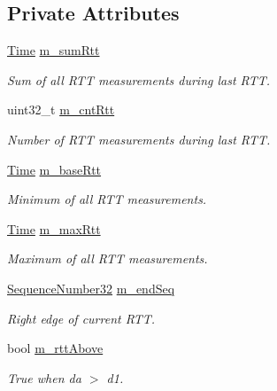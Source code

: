 \subsection*{Private Attributes}
\begin{DoxyCompactItemize}
\item 
\hyperlink{classns3_1_1Time}{Time} \hyperlink{classns3_1_1TcpIllinois_ad55319050ef5775367528ab1e2a1495d}{m\+\_\+sum\+Rtt}
\begin{DoxyCompactList}\small\item\em Sum of all R\+TT measurements during last R\+TT. \end{DoxyCompactList}\item 
uint32\+\_\+t \hyperlink{classns3_1_1TcpIllinois_a60caf4d41dc12eaf51e6fa4d2bc37cf9}{m\+\_\+cnt\+Rtt}
\begin{DoxyCompactList}\small\item\em Number of R\+TT measurements during last R\+TT. \end{DoxyCompactList}\item 
\hyperlink{classns3_1_1Time}{Time} \hyperlink{classns3_1_1TcpIllinois_a50fb2e63ddbc6291c27c6360f871ec9f}{m\+\_\+base\+Rtt}
\begin{DoxyCompactList}\small\item\em Minimum of all R\+TT measurements. \end{DoxyCompactList}\item 
\hyperlink{classns3_1_1Time}{Time} \hyperlink{classns3_1_1TcpIllinois_a7b039403de33bd3240a29d0fed26f813}{m\+\_\+max\+Rtt}
\begin{DoxyCompactList}\small\item\em Maximum of all R\+TT measurements. \end{DoxyCompactList}\item 
\hyperlink{group__network_gacb2070e4e98d2d5135c9bede58f07a03}{Sequence\+Number32} \hyperlink{classns3_1_1TcpIllinois_afcee0e1f0f09abb49ddc440851500b46}{m\+\_\+end\+Seq}
\begin{DoxyCompactList}\small\item\em Right edge of current R\+TT. \end{DoxyCompactList}\item 
bool \hyperlink{classns3_1_1TcpIllinois_a1cc085ed6b4561e2eee0eb33dd880da6}{m\+\_\+rtt\+Above}
\begin{DoxyCompactList}\small\item\em True when da $>$ d1. \end{DoxyCompactList}\item 

\end{DoxyCompactItemize}
